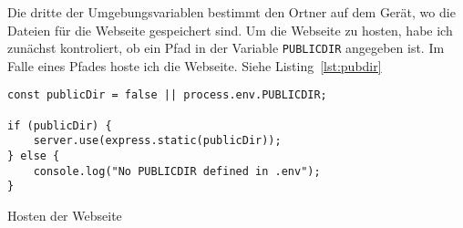 \documentclass[a4paper, ngerman, 12pt]{scrartcl}
\begin{document}
Die dritte der Umgebungsvariablen bestimmt den Ortner auf dem Gerät, wo die Dateien für die Webseite gespeichert sind.
Um die Webseite zu hosten, habe ich zunächst kontroliert, ob ein Pfad in der Variable \texttt{PUBLICDIR} angegeben ist. Im Falle eines Pfades hoste ich die Webseite. Siehe Listing~\ref{lst:pubdir}
\begin{listing}[hb]
\centering
\begin{verbatim}
const publicDir = false || process.env.PUBLICDIR;

if (publicDir) {
	server.use(express.static(publicDir));
} else {
	console.log("No PUBLICDIR defined in .env");
}
\end{verbatim}
\caption{Hosten der Webseite\label{lst:pubdir}}
\end{listing}
\clearpage{}
\printbibheading{}
\printbibliography[type=book,heading=subbibliography,title={Buch Quellen}]
\printbibliography[type=misc,heading=subbibliography,title={Internet Quellen}]
\end{document}
